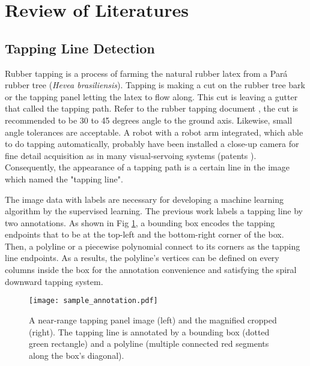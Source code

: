 \documentclass[default,pdflatex,iicol]{sn-jnl}%
\begin{document}
\section{Review of Literatures}\label{sec-review}
\subsection{Tapping Line Detection}
Rubber tapping is a process of farming the natural rubber latex from a Pará rubber tree (\textit{Hevea brasiliensis}). Tapping is making a cut on the rubber tree bark or the tapping panel letting the latex to flow along. This cut is leaving a gutter that called the tapping path. Refer to the rubber tapping document \cite{abraham1992tapping}, the cut is recommended to be 30 to 45 degrees angle to the ground axis. Likewise, small angle tolerances are acceptable. A robot with a robot arm integrated, which able to do tapping automatically, probably have been installed a close-up camera for fine detail acquisition as in many visual-servoing systems (patents \cite{patent1, patent2, patent3}). Consequently, the appearance of a tapping path is a certain line in the image which named the "tapping line".

The image data with labels are necessary for developing a machine learning algorithm by the supervised learning. The previous work \cite{Wongtanawijit_2021} labels a tapping line by two annotations. As shown in Fig \ref{fig-sampleannotation}, a bounding box encodes the tapping endpoints that to be at the top-left and the bottom-right corner of the box. Then, a polyline or a piecewise polynomial connect to its corners as the tapping line endpoints. As a results, the polyline's vertices can be defined on every columns inside the box for the annotation convenience and satisfying the spiral downward tapping system.

\begin{figure}[h]%
\centering
\texttt{[image: sample\_annotation.pdf]}
\caption{A near-range tapping panel image (left) and the magnified cropped (right). The tapping line is annotated by a bounding box (dotted green rectangle) and a polyline (multiple connected red segments along the box's diagonal).}\label{fig-sampleannotation}
\end{figure}
\end{document}
